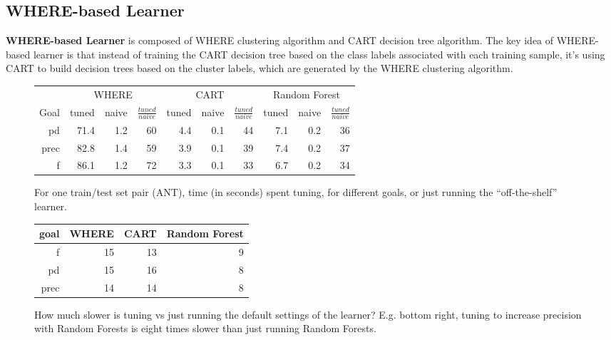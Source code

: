 \documentclass{sig-alternative}
\def\baselinestretch{1}
\begin{document}
 \subsection{WHERE-based Learner}
\textbf{WHERE-based Learner} is composed of WHERE clustering algorithm and CART 
decision tree algorithm. The key idea of WHERE-based learner is that  instead of training the 
CART decision tree based on the class labels associated with each training sample, it's using 
CART to build decision trees based on the cluster labels, which are generated by the WHERE 
clustering algorithm.
 
 
 
\begin{figure}[!t]

\renewcommand{\baselinestretch}{0.8}
\scriptsize
\centering
  \begin{tabular}{r@{~}|r@{~}rr|r@{~}rr|r@{~}rr}
    & \multicolumn{3}{c|}{WHERE}&\multicolumn{3}{c|}{CART}& \multicolumn{3}{c}{Random Forest}\\\cline{2-10} 
    Goal & tuned & naive &$\frac{\mathit{tuned}}{\mathit{naive}}$& tuned & naive &$\frac{\mathit{tuned}}{\mathit{naive}}$& tuned & naive&$\frac{\mathit{tuned}}{\mathit{naive}}$\\\hline
pd&71.4&1.2&60&4.4&0.1&44&7.1&0.2&36\\ 
prec&82.8&1.4&59&3.9&0.1&39&7.4&0.2&37\\
f&86.1&1.2&72&3.3&0.1&33&6.7&0.2&34
  \end{tabular}
  \caption{For one train/test set pair (ANT),  time (in seconds) spent tuning,
  for different goals, or just running the ``off-the-shelf'' learner.}
\end{figure}


\begin{figure}[!t]

\renewcommand{\baselinestretch}{0.8}
\scriptsize
\centering
\begin{tabular}{r|rrr}
goal &	WHERE	&CART&	Random Forest\\\hline
f	&15	&13	&9\\ 
pd	&15	&16	&8\\ 
prec&	14	&14	&8
\end{tabular}
\caption{How much slower is tuning vs just running the default
settings of the learner? E.g. bottom right, tuning to increase
precision with Random Forests is eight times slower than
just running Random Forests.}
\end{figure}
\end{document}
